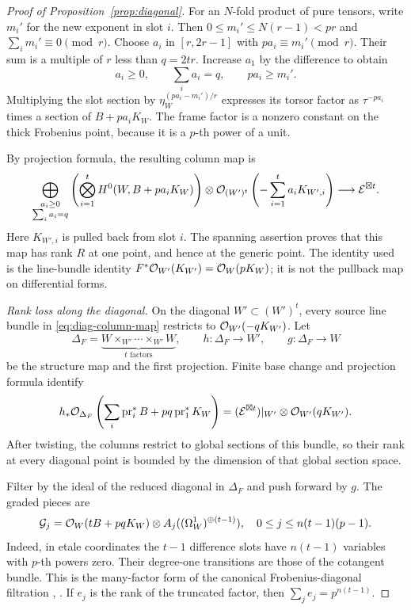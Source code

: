 \begin{proof}[Proof of Proposition~\ref{prop:diagonal}]
For an $N$-fold product of pure tensors, write $m_i'$ for the new
exponent in slot $i$. Then $0\le m_i'\le N(r-1)<pr$ and
$\sum_i m_i'\equiv0\pmod r$. Choose $a_i$ in $[r,2r-1]$ with
$pa_i\equiv m_i'\pmod r$. Their sum is a multiple of $r$ less
than $q=2tr$. Increase $a_1$ by the difference to obtain
\[
 a_i\ge0,\qquad \sum_i a_i=q,\qquad pa_i\ge m_i'.
\]
Multiplying the slot section by
$\eta_W^{(pa_i-m_i')/r}$ expresses its torsor factor as
$\tau^{-pa_i}$ times a section of $B+pa_iK_W$.
The frame factor is a nonzero constant on the thick Frobenius
point, because it is a $p$-th power of a unit.

By projection formula, the resulting column map is
\begin{equation}\label{eq:diag-column-map}
 \begin{split}
 \bigoplus_{\substack{a_i\ge0\\\sum_i a_i=q}}
 \left(\bigotimes_{i=1}^t H^0(W,B+pa_iK_W)\right)
 \otimes\mathcal O_{(W')^t}\left(-\sum_{i=1}^t a_iK_{W',i}\right)
 \longrightarrow\mathcal E^{\boxtimes t}.
 \end{split}
\end{equation}
Here $K_{W',i}$ is pulled back from slot $i$.
The spanning assertion proves that this map has rank $R$ at one
point, and hence at the generic point. The identity used is the
line-bundle identity $F^*\mathcal O_{W'}(K_{W'})=\mathcal O_W(pK_W)$;
it is not the pullback map on differential forms.

\medskip\noindent\emph{Rank loss along the diagonal.}
On the diagonal $W'\subset(W')^t$, every source line bundle in
\eqref{eq:diag-column-map} restricts to $\mathcal O_{W'}(-qK_{W'})$.
Let
\[
 \Delta_F=\underbrace{W\times_{W'}\cdots\times_{W'}W}_{t\text{ factors}},
 \qquad h:\Delta_F\to W',\qquad g:\Delta_F\to W
\]
be the structure map and the first projection. Finite base change
and projection formula identify
\[
 h_*\mathcal O_{\Delta_F}\left(\sum_i\operatorname{pr}_i^*B
              +pq\operatorname{pr}_1^*K_W\right)
 = (\mathcal E^{\boxtimes t})|_{W'}\otimes\mathcal O_{W'}(qK_{W'}).
\]
After twisting, the columns restrict to global sections of this
bundle, so their rank at every diagonal point is bounded by the
dimension of that global section space.

Filter by the ideal of the reduced diagonal in $\Delta_F$ and
push forward by $g$. The graded pieces are
\begin{equation}\label{eq:diag-graded}
 \mathcal G_j=\mathcal O_W(tB+pqK_W)
          \otimes A_j((\Omega_W^1)^{\oplus(t-1)}),
 \quad 0\le j\le n(t-1)(p-1).
\end{equation}
Indeed, in etale coordinates the $t-1$ difference slots have
$n(t-1)$ variables with $p$-th powers zero. Their degree-one
transitions are those of the cotangent bundle. This is the
many-factor form of the canonical Frobenius-diagonal filtration
\cite[Theorem~3.7]{Sun2008},
\cite[Definition~3.1 and Corollary~3.5]{KitadaiSumihiro2008}.
If $e_j$ is the rank of the truncated factor, then
$\sum_j e_j=p^{n(t-1)}$.


\end{proof}
